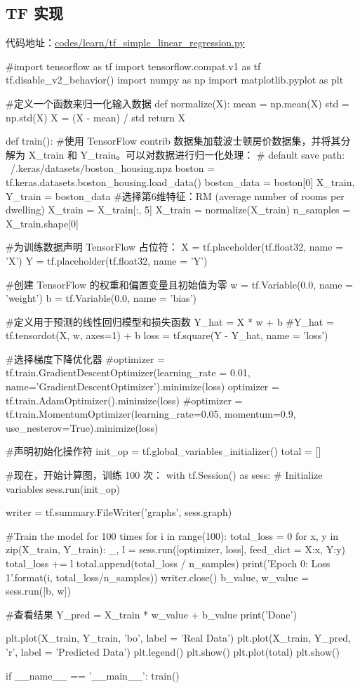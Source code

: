 \documentclass[12pt]{article}
\begin{document}
\subsection{TF 实现}
代码地址：\url{codes/learn/tf_simple_linear_regression.py}
\begin{python}
#import tensorflow as tf
import tensorflow.compat.v1 as tf
tf.disable_v2_behavior()
import numpy as np
import matplotlib.pyplot as plt

#定义一个函数来归一化输入数据
def normalize(X):
    mean = np.mean(X)
    std = np.std(X)
    X = (X - mean) / std
    return X

def train():
    #使用 TensorFlow contrib 数据集加载波士顿房价数据集，并将其分解为 X_train 和 Y_train。可以对数据进行归一化处理：
    # default save path: ~/.keras/datasets/boston_housing.npz
    boston = tf.keras.datasets.boston_housing.load_data()
    boston_data = boston[0]
    X_train, Y_train = boston_data
    #选择第6维特征：RM (average number of rooms per dwelling)
    X_train = X_train[:, 5]
    X_train = normalize(X_train)
    n_samples = X_train.shape[0]

    #为训练数据声明 TensorFlow 占位符：
    X = tf.placeholder(tf.float32, name = 'X')
    Y = tf.placeholder(tf.float32, name = 'Y')

    #创建 TensorFlow 的权重和偏置变量且初始值为零
    w = tf.Variable(0.0, name = 'weight')
    b = tf.Variable(0.0, name = 'bias')

    #定义用于预测的线性回归模型和损失函数
    Y_hat = X * w + b
    #Y_hat = tf.tensordot(X, w, axes=1) + b
    loss = tf.square(Y - Y_hat, name = 'loss')

    #选择梯度下降优化器
    #optimizer = tf.train.GradientDescentOptimizer(learning_rate = 0.01, name='GradientDescentOptimizer').minimize(loss)
    optimizer = tf.train.AdamOptimizer().minimize(loss)
    #optimizer = tf.train.MomentumOptimizer(learning_rate=0.05, momentum=0.9, use_nesterov=True).minimize(loss)

    #声明初始化操作符
    init_op = tf.global_variables_initializer()
    total = []

    #现在，开始计算图，训练 100 次：
    with tf.Session() as sess:
        # Initialize variables
        sess.run(init_op)

        writer = tf.summary.FileWriter('graphs', sess.graph)

        #Train the model for 100 times
        for i in range(100):
            total_loss = 0
            for x, y in zip(X_train, Y_train):
                _, l = sess.run([optimizer, loss], feed_dict = {X:x, Y:y})
                total_loss += l
            total.append(total_loss / n_samples)
            print('Epoch {0}: Loss {1}'.format(i, total_loss/n_samples))
        writer.close()
        b_value, w_value = sess.run([b, w])

    #查看结果
    Y_pred = X_train * w_value + b_value
    print('Done')

    plt.plot(X_train, Y_train, 'bo', label = 'Real Data')
    plt.plot(X_train, Y_pred, 'r', label = 'Predicted Data')
    plt.legend()
    plt.show()
    plt.plot(total)
    plt.show()

if __name__ == '__main__':
    train()
\end{python}
\end{document}
